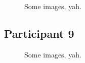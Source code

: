 \lipsum[1]

\clearpage

\begin{figure}[h]
	\caption{Some images, yah.}
\end{figure}

\lipsum[1]


\clearpage

\subsection{Participant 9}

\begin{figure}[h]
	\caption{Some images, yah.}
\end{figure}


